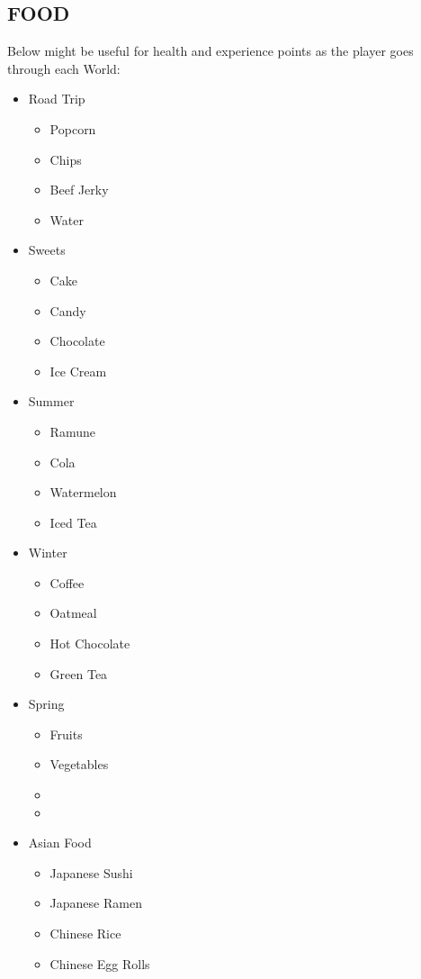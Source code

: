 \documentclass[11pt]{article}
\begin{document}
	\subsection*{FOOD}
	Below might be useful for health and experience points as the player goes through each World:
	\begin{itemize}[noitemsep]
		\item Road Trip
		\begin{itemize}[noitemsep,nosep]
			\item Popcorn
			\item Chips
			\item Beef Jerky
			\item Water
		\end{itemize}
		\item Sweets
		\begin{itemize}[noitemsep,nosep]
			\item Cake
			\item Candy
			\item Chocolate
			\item Ice Cream
		\end{itemize}
		\item Summer
		\begin{itemize}[noitemsep,nosep]
			\item Ramune
			\item Cola
			\item Watermelon
			\item Iced Tea
		\end{itemize}
		\item Winter
		\begin{itemize}[noitemsep,nosep]
			\item Coffee
			\item Oatmeal
			\item Hot Chocolate
			\item Green Tea
		\end{itemize}
		\item Spring
		\begin{itemize}[noitemsep,nosep]
			\item Fruits
			\item Vegetables
			\item 
			\item 
		\end{itemize}
		\item Asian Food
		\begin{itemize}[noitemsep,nosep]
			\item Japanese Sushi
			\item Japanese Ramen
			\item Chinese Rice
			\item Chinese Egg Rolls
		\end{itemize}
	\end{itemize}
	\newpage
\end{document}
